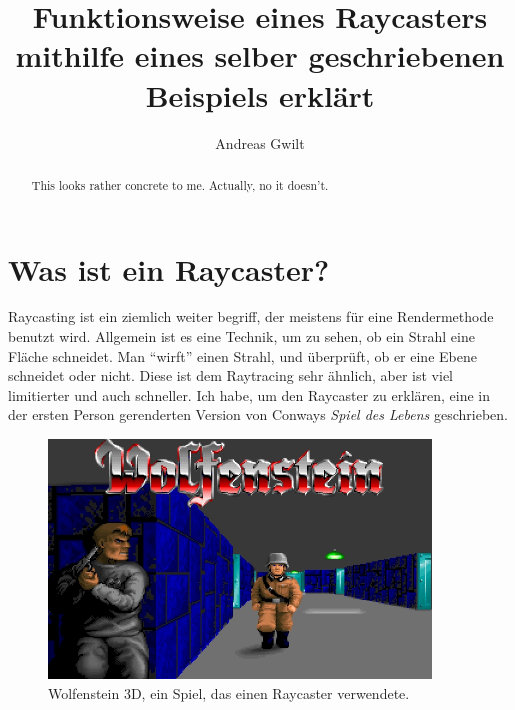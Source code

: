 \documentclass[a4paper,12pt]{report}
\title{Funktionsweise eines Raycasters mithilfe eines selber geschriebenen Beispiels erkl\"art}
\author{Andreas Gwilt}
\begin{document}
\maketitle
\tableofcontents

\begin{abstract}
This looks rather concrete to me. Actually, no it doesn't.
\end{abstract}

\section{Was ist ein Raycaster?}
Raycasting ist ein ziemlich weiter begriff, der meistens für eine Rendermethode benutzt wird. Allgemein ist es eine Technik, um zu sehen, ob ein Strahl eine Fläche schneidet. Man ``wirft'' einen Strahl, und überprüft, ob er eine Ebene schneidet oder nicht. Diese ist dem Raytracing sehr ähnlich, aber ist viel limitierter und auch schneller.
Ich habe, um den Raycaster zu erklären, eine in der ersten Person gerenderten Version von Conways \textit{Spiel des Lebens} geschrieben. 

\begin{figure}[htbp] 
        \centering
        \includegraphics[width=4in]{wolfenstein-cover.jpg} 
        \caption{Wolfenstein 3D, ein Spiel, das einen Raycaster verwendete.}
\end{figure}
\end{document}
